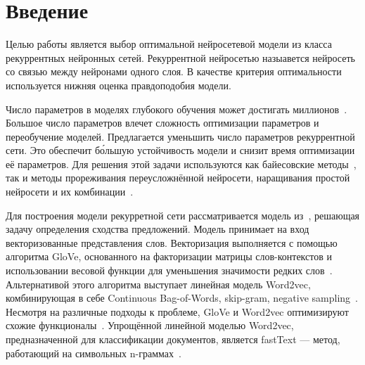 \documentclass[12pt, fleqn, unicode]{article}
\begin{document}
\newpage

\section{Введение}
Целью работы является выбор оптимальной нейросетевой модели  из класса рекуррентных нейронных сетей. Рекуррентной нейросетью назыавется нейросеть со связью между нейронами одного слоя. В качестве критерия оптимальности используется нижняя оценка правдоподобия модели. 

Число параметров в моделях глубокого обучения может достигать миллионов~\cite{DeepGoogle}. Большое число параметров влечет сложность оптимизации параметров и переобучение моделей\cite{Bishop}. Предлагается уменьшить число параметров рекуррентной сети. Это обеспечит б\'{о}льшую устойчивость модели и снизит время оптимизации её параметров. Для решения этой задачи используются как байесовские методы~\cite{Strijov_1}, так и методы прореживания переусложнённой нейросети, наращивания простой нейросети и их комбинации~\cite{Strijov_2}.

Для построения модели рекурретной сети рассматривается модель из~\cite{Sanborn}, решающая задачу определения сходства предложений.
Модель принимает на вход векторизованные представления слов. Векторизация выполняется с помощью алгоритма GloVe, основанного на факторизации матрицы слов-контекстов и использовании весовой функции для уменьшения значимости редких слов~\cite{GloVe}. Альтернативой этого алгоритма выступает линейная модель Word2vec, комбинирующая в себе Continuous Bag-of-Words, skip-gram, negative sampling~\cite{word2vec}. Несмотря на различные подходы к проблеме, GloVe и Word2vec оптимизируют схожие функционалы~\cite{Glo2vec}. Упрощённой линейной моделью Word2vec, предназначенной для классификации документов, является fastText --- метод, работающий на символьных n-граммах~\cite{fastText}. 

\end{document}

